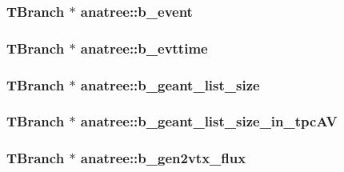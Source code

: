 \hypertarget{classanatree_aff7d04fe7e6a48bed9288c487c70b730}{
\subsubsection[{b\-\_\-event}]{\setlength{\rightskip}{0pt plus 5cm}T\-Branch $\ast$ anatree\-::b\-\_\-event}}\label{classanatree_aff7d04fe7e6a48bed9288c487c70b730}
\hypertarget{classanatree_a5e1949d72f71c3126f5da8e8f5064152}{
\subsubsection[{b\-\_\-evttime}]{\setlength{\rightskip}{0pt plus 5cm}T\-Branch $\ast$ anatree\-::b\-\_\-evttime}}\label{classanatree_a5e1949d72f71c3126f5da8e8f5064152}
\hypertarget{classanatree_a93b176b810cb70bbbc3a4f3637d34ca0}{
\subsubsection[{b\-\_\-geant\-\_\-list\-\_\-size}]{\setlength{\rightskip}{0pt plus 5cm}T\-Branch $\ast$ anatree\-::b\-\_\-geant\-\_\-list\-\_\-size}}\label{classanatree_a93b176b810cb70bbbc3a4f3637d34ca0}
\hypertarget{classanatree_a2fe631d23ec23018bb07c1df4dc5a086}{
\subsubsection[{b\-\_\-geant\-\_\-list\-\_\-size\-\_\-in\-\_\-tpc\-A\-V}]{\setlength{\rightskip}{0pt plus 5cm}T\-Branch $\ast$ anatree\-::b\-\_\-geant\-\_\-list\-\_\-size\-\_\-in\-\_\-tpc\-A\-V}}\label{classanatree_a2fe631d23ec23018bb07c1df4dc5a086}
\hypertarget{classanatree_a2296fab8dc0c2d1e7d0ee710d2882fd0}{
\subsubsection[{b\-\_\-gen2vtx\-\_\-flux}]{\setlength{\rightskip}{0pt plus 5cm}T\-Branch $\ast$ anatree\-::b\-\_\-gen2vtx\-\_\-flux}}\label{classanatree_a2296fab8dc0c2d1e7d0ee710d2882fd0}
